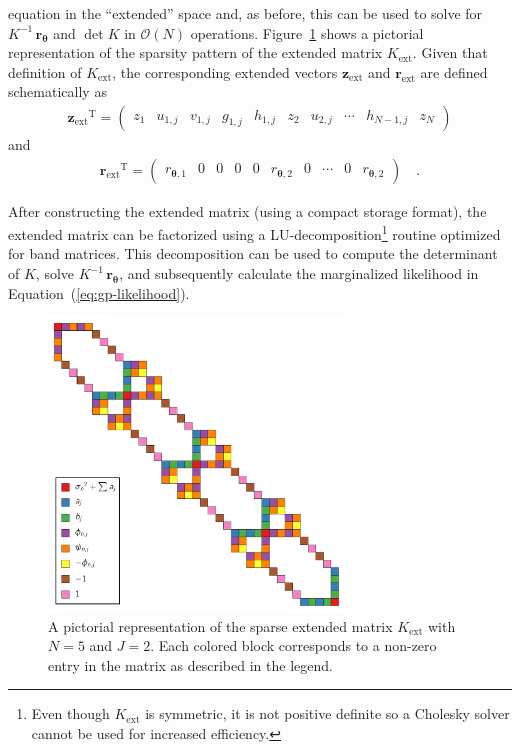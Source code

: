 \documentclass[manuscript, letterpaper]{aastex6}
\newcommand{\figureref}[1]{\ref{fig:#1}}
\newcommand{\Figure}[1]{Figure~\figureref{#1}}
\newcommand{\figurelabel}[1]{\label{fig:#1}}
\renewcommand{\eqref}[1]{\ref{eq:#1}}
\newcommand{\Eq}[1]{Equation~(\eqref{#1})}
\newcommand{\eq}[1]{\Eq{#1}}
\newcommand{\T}{\ensuremath{\mathrm{T}}}
\newcommand{\bvec}[1]{{\ensuremath{\boldsymbol{#1}}}}
\begin{document}
equation in the ``extended'' space and, as before, this can be used to solve
for $K^{-1}\,\bvec{r}_\bvec{\theta}$ and $\det K$ in $\mathcal{O}(N)$
operations.
\Figure{matrix} shows a pictorial representation of the sparsity pattern of
the extended matrix $K_\mathrm{ext}$.
Given that definition of $K_\mathrm{ext}$, the corresponding extended vectors
$\bvec{z}_\mathrm{ext}$ and $\bvec{r}_\mathrm{ext}$ are defined schematically
as
\begin{eqnarray}
{\bvec{z}_\mathrm{ext}} ^\T =
\left(\begin{array}{cccccccccc}
    z_1 & u_{1,j} & v_{1,j} & g_{1,j} & h_{1,j} & z_2 & u_{2,j} & \cdots &
    h_{N-1,j} & z_N
\end{array}\right)
\end{eqnarray}
and
\begin{eqnarray}
{\bvec{r}_\mathrm{ext}} ^\T =
\left(\begin{array}{cccccccccc}
    r_{\bvec{\theta},1} & 0 & 0 & 0 & 0 & r_{\bvec{\theta},2} &
    0 & \cdots & 0 & r_{\bvec{\theta},2}
\end{array}\right) \quad.
\end{eqnarray}

After constructing the extended matrix (using a compact storage format), the
extended matrix can be factorized using a LU-decomposition\footnote{Even
though $K_\mathrm{ext}$ is symmetric, it is not positive definite so a
Cholesky solver cannot be used for increased efficiency.} routine optimized
for band matrices.
This decomposition can be used to compute the determinant of $K$, solve
$K^{-1}\,\bvec{r}_\bvec{\theta}$, and subsequently calculate the marginalized
likelihood in \eq{gp-likelihood}.

\begin{figure}[!htbp]
\begin{center}
\includegraphics[width=0.7\textwidth]{figures/matrix.pdf}
\caption{A pictorial representation of the sparse extended matrix
$K_\mathrm{ext}$ with $N=5$ and $J=2$.
Each colored block corresponds to a non-zero entry in the matrix as described
in the legend.
    \figurelabel{matrix}}
\end{center}
\end{figure}
\end{document}
